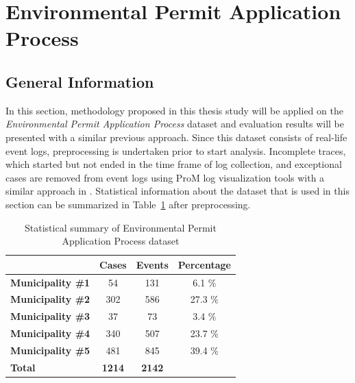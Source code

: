\section{Environmental Permit Application Process}
\label{sec:coselog-wabo-process}

\subsection{General Information}
\label{subsec:coselog-wabo-information}

In this section, methodology proposed in this thesis study will be applied on the \textit{Environmental Permit Application Process} dataset \cite{coselog-data} and evaluation results will be presented with a similar previous approach. Since this dataset consists of real-life event logs, preprocessing is undertaken prior to start analysis. Incomplete traces, which started but not ended in the time frame of log collection, and exceptional cases are removed from event logs using ProM log visualization tools with a similar approach in \cite{buijs2014flexible}. Statistical information about the dataset that is used in this section can be summarized in Table~\ref{table:coselog-process-summary} after preprocessing.

 \begin{table}[]
\centering
\caption{Statistical summary of Environmental Permit Application Process dataset}
\label{table:coselog-process-summary}
\begin{tabular}{lccc}
\hline
                       & {\bf Cases} & {\bf Events} & {\bf Percentage} \\ \midrule
{\bf Municipality \#1} & 54          & 131          & 6.1 \%           \\ \midrule
{\bf Municipality \#2} & 302         & 586          & 27.3 \%          \\ \midrule
{\bf Municipality \#3} & 37          & 73           & 3.4 \%           \\ \midrule
{\bf Municipality \#4} & 340         & 507          & 23.7 \%          \\ \midrule
{\bf Municipality \#5} & 481         & 845          & 39.4 \%          \\ \midrule
{\bf Total}            & {\bf 1214}  & {\bf 2142}   & {\bf }           \\ \bottomrule
\end{tabular}
\end{table}


